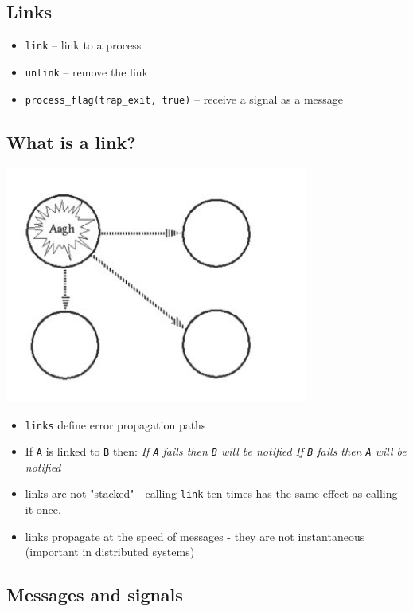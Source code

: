 \documentclass[12pt]{article}
\begin{document}
\begin{itemize}
\section{Links}

\begin{itemize}
\item \verb+link+ -- link to a process
\item \verb+unlink+ -- remove the link
\item \verb+process_flag(trap_exit, true)+ -- receive a signal as a message
\end{itemize}

\subsection{What is a link?}


\includegraphics[width=10cm]{images/crash.jpg}

\begin{itemize}
\item \verb+links+ define error propagation paths
\item If \verb+A+ is linked to \verb+B+ then:
{\sl If \verb+A+ fails then \verb+B+ will be notified}
{\sl If \verb+B+ fails then \verb+A+ will be notified}
\item links are not "stacked" - calling \verb+link+ ten times has the same effect as
calling it once.
\item links propagate at the speed of messages - they are not instantaneous
(important in distributed systems)
\end{itemize}


\subsection{Messages and signals}


\end{itemize}
\end{document}
